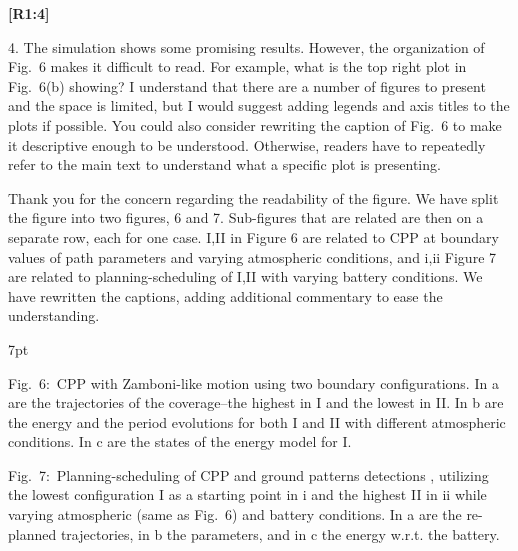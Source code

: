 \documentclass[10pt]{letter}
\newenvironment{formal}{%
  \def\FrameCommand{%
    \hspace{1pt}%
    {\color{red}\vrule width 2pt}%
    {\color{formalshade}\vrule width 4pt}%
    \colorbox{formalshade}%
  }%
  \MakeFramed{\advance\hsize-\width\FrameRestore}%
  \noindent\hspace{-4.55pt}%
  \begin{adjustwidth}{}{7pt}%
  \vspace{2pt}\vspace{2pt}%
}
{%
  \vspace{2pt}\end{adjustwidth}\endMakeFramed%
}
\begin{document}
{\hspace*{-4.5em}\textbf{[R1:4]}\vspace*{-1.9em}}


4. The simulation shows some promising results. However, the organization of Fig.~6 makes it difficult to read. For example, what is the top right plot in Fig.~6(b) showing? I understand that there are a number of figures to present and the space is limited, but I would suggest adding legends and axis titles to the plots if possible. You could also consider rewriting the caption of Fig.~6 to make it descriptive enough to be understood. Otherwise, readers have to repeatedly refer to the main text to understand what a specific plot is presenting.

{\color{blue} 


{\hspace*{-4.5em}{[R1:4]}\vspace*{-1.9em}}

Thank you for the concern regarding the readability of the figure. We have split the figure into two figures, 6 and 7. Sub-figures that are related are then on a separate row, each for one case. I,II in Figure 6 are related to CPP at boundary values of path parameters and varying atmospheric conditions, and i,ii Figure 7 are related to planning-scheduling of I,II with varying battery conditions. We have rewritten the captions, adding additional commentary to ease the understanding.

\begin{formal}
  \footnotesize
  
  {\color{blue}Fig.~6:~\color{blue}CPP with Zamboni-like motion using two boundary configurations. In {\color{red}a} are the trajectories of the coverage--the highest in {\color{red}I} and the lowest in {\color{red}II}. In {\color{red}b} are the energy and the period evolutions for both {\color{red}I} and {\color{red}II} with different atmospheric conditions. In {\color{red}c} are the states of the energy model for {\color{red}I}.}

  
  \vspace*{-.6ex}
  {\color{blue}
  Fig.~7:~Planning-scheduling of CPP and ground patterns detections%
  , utilizing the lowest configuration {\color{red}I} as a starting point in {\color{red}i} and the highest {\color{red}II} in {\color{red}ii} while varying atmospheric (same as Fig.~{\color{red}6}) and battery conditions. In {\color{red}a} are the re-planned trajectories, in {\color{red}b} the parameters, and in {\color{red}c} the energy w.r.t. the battery.}
  \vspace*{1ex}
\end{formal}
}
\end{document}
